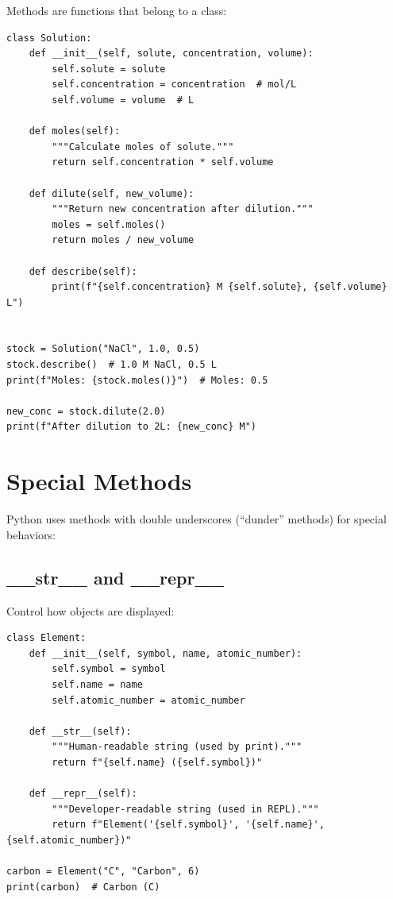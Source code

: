 Methods are functions that belong to a class:

\begin{lstlisting}
class Solution:
    def __init__(self, solute, concentration, volume):
        self.solute = solute
        self.concentration = concentration  # mol/L
        self.volume = volume  # L

    def moles(self):
        """Calculate moles of solute."""
        return self.concentration * self.volume

    def dilute(self, new_volume):
        """Return new concentration after dilution."""
        moles = self.moles()
        return moles / new_volume

    def describe(self):
        print(f"{self.concentration} M {self.solute}, {self.volume} L")


stock = Solution("NaCl", 1.0, 0.5)
stock.describe()  # 1.0 M NaCl, 0.5 L
print(f"Moles: {stock.moles()}")  # Moles: 0.5

new_conc = stock.dilute(2.0)
print(f"After dilution to 2L: {new_conc} M")
\end{lstlisting}

\section{Special Methods}
\label{sec:special-methods}

Python uses methods with double underscores (``dunder'' methods) for special behaviors:

\subsection{\_\_str\_\_ and \_\_repr\_\_}

Control how objects are displayed:

\begin{lstlisting}
class Element:
    def __init__(self, symbol, name, atomic_number):
        self.symbol = symbol
        self.name = name
        self.atomic_number = atomic_number

    def __str__(self):
        """Human-readable string (used by print)."""
        return f"{self.name} ({self.symbol})"

    def __repr__(self):
        """Developer-readable string (used in REPL)."""
        return f"Element('{self.symbol}', '{self.name}', {self.atomic_number})"

carbon = Element("C", "Carbon", 6)
print(carbon)  # Carbon (C)
\end{lstlisting}

